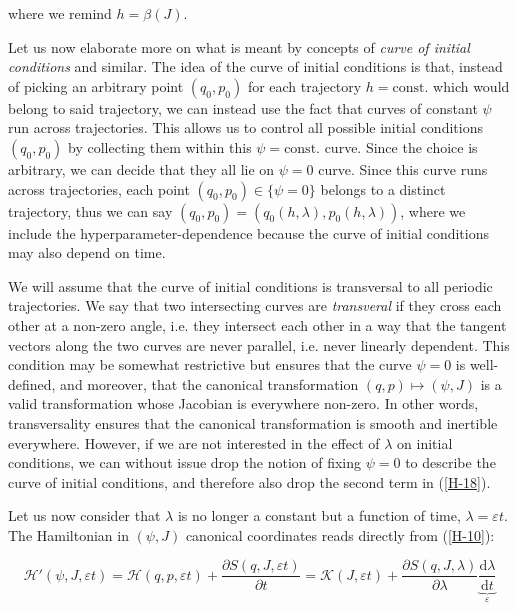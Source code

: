 where we remind $h=\beta(J)$.

\vspace*{2.5pt}

\quad Let us now elaborate more on what is meant by concepts of \textit{curve of initial conditions} and similar. The idea of the curve of initial conditions is that, instead of picking an arbitrary point $(q_0,p_0)$ for each trajectory $h=\text{const.}$ which would belong to said trajectory, we can instead use the fact that curves of constant $\psi$ run across trajectories. This allows us to control all possible initial conditions $(q_0,p_0)$ by collecting them within this $\psi=\text{const.}$ curve. Since the choice is arbitrary, we can decide that they all lie on $\psi=0$ curve. Since this curve runs across trajectories, each point $(q_0,p_0)\in\{\psi=0\}$ belongs to a distinct trajectory, thus we can say $(q_0,p_0)=\left(q_0(h,\lambda),p_0(h,\lambda)\right)$, where we include the hyperparameter-dependence because the curve of initial conditions may also depend on time.

\vspace*{2.5pt}

\quad We will assume that the curve of initial conditions is transversal to all periodic trajectories. We say that two intersecting curves are \textit{transveral} if they cross each other at a non-zero angle, i.e. they intersect each other in a way that the tangent vectors along the two curves are never parallel, i.e. never linearly dependent. This condition may be somewhat restrictive but ensures that the curve $\psi=0$ is well-defined, and moreover, that the canonical transformation $(q,p)\mapsto (\psi,J)$ is a valid transformation whose Jacobian is everywhere non-zero. In other words, transversality ensures that the canonical transformation is smooth and inertible everywhere. However, if we are not interested in the effect of $\lambda$ on initial conditions, we can without issue drop the notion of fixing $\psi=0$ to describe the curve of initial conditions, and therefore also drop the second term in (\ref{H-18}).

\vspace*{2.5pt}

\quad Let us now consider that $\lambda$ is no longer a constant but a function of time, $\lambda=\varepsilon t$. The Hamiltonian in $(\psi, J)$ canonical coordinates reads directly from (\ref{H-10}):

\begin{equation}
    \label{H-17}
    \mathcal{H}'(\psi,J,\varepsilon t)=\mathcal{H}(q,p,\varepsilon t)+\frac{\partial S(q,J,\varepsilon t)}{\partial t}=\mathcal{K}(J,\varepsilon t)+\frac{\partial S(q,J,\lambda)}{\partial \lambda}\underbrace{\frac{\mathrm{d}\lambda}{\mathrm{d}t}}_{\varepsilon}
\end{equation}

